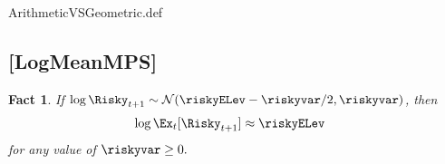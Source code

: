 \documentclass{handout}
\newtheorem{Fact}{Fact}
\begin{document}
\begin{verbatimwrite}{ArithmeticVSGeometric.def}
\providecommand{\ELogNormMeanOne}{\href{https://www.econ2.jhu.edu/people/ccarroll/public/LectureNotes/MathFacts/MathFactsList\#ArithmeticVSGeometric}{\ensuremath{\mathtt{[ArithmeticVSGeometric]}}}}
\end{verbatimwrite}


\begin{comment} %
\hypertarget{MeanOne}{}
\subsection{[MeanOne]}

\begin{Fact} If $\log \Risky_{t+1} \sim \mathcal{N}(-\riskyvar/2,\riskyvar)$, then
\begin{equation}\begin{gathered}\begin{aligned}
        \Ex_{t}[\Risky_{t+1}] & =  1
\end{aligned}\end{gathered}\end{equation}
\end{Fact}

This follows from substituting $- \riskyvar/2$ for $\mu$ in \ELogNorm.

\begin{verbatimwrite}{MeanOne.def}
\providecommand{\MeanOne}{\href{https://www.econ2.jhu.edu/people/ccarroll/public/LectureNotes/MathFacts/MathFactsList\#MeanOne}{\ensuremath{\mathtt{[MeanOne]}}}}
\end{verbatimwrite}
\end{comment}

\hypertarget{LogMeanMPS}{}
\subsection{[LogMeanMPS]}

\begin{Fact} If $\log \Risky_{t+1} \sim \mathcal{N}(\null{\riskyELev}-\riskyvar/2,\riskyvar)$, then
\begin{equation}\begin{gathered}\begin{aligned}
      \log  \Ex_{t}[\Risky_{t+1}] & \approx  \riskyELev
\end{aligned}\end{gathered}\end{equation}
for any value of $\riskyvar \geq 0.$
\end{Fact}
\end{document}
